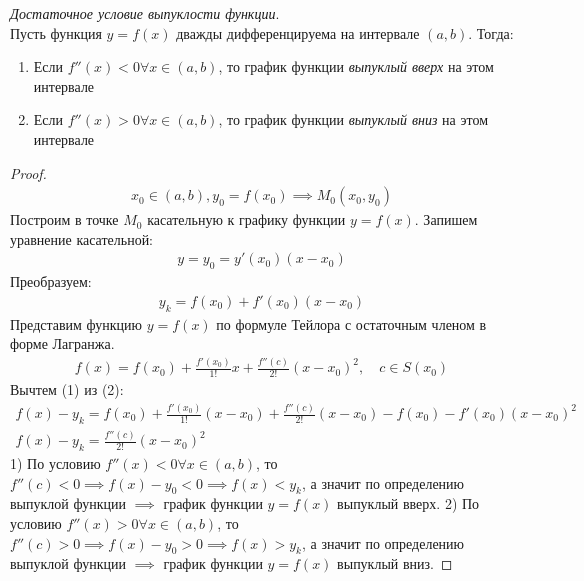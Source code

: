 \begin{theorem}
  \textit{Достаточное условие выпуклости функции}. \\
  Пусть функция $y = f(x)$ дважды дифференцируема на интервале  $(a, b)$. 
  Тогда: 
  \begin{enumerate}
    \item Если  $f''(x) < 0 \forall  x \in (a, b)$, то график функции \textit{выпуклый вверх} на этом интервале
    \item Если  $f''(x) > 0 \forall  x \in (a, b)$, то график функции \textit{выпуклый вниз} на этом интервале
  \end{enumerate}
\end{theorem}
\begin{proof}
  \begin{gather*}
    x_0 \in (a, b), y_0 = f(x_0) \implies M_0(x_0, y_0)
  \end{gather*}
  Построим в точке $M_0$ касательную к графику функции $y = f(x)$. Запишем уравнение касательной:
   \begin{gather*}
    y = y_0 = y'(x_0)(x - x_0) 
  \end{gather*}
  Преобразуем:
  \begin{gather*}
    y_k = f(x_0) + f'(x_0)(x - x_0) \tag{0} 
  \end{gather*}
  Представим функцию $y=f(x)$ по формуле Тейлора с остаточным членом в форме Лагранжа.
  \begin{gather*}
    f(x) = f(x_0) + \frac{f'(x_0)}{1!}x + \frac{f''(c)}{2!}(x - x_0)^2, \quad c \in S(x_0) \tag{2} 
  \end{gather*}
  Вычтем (1) из (2):
  \begin{gather*}
    f(x) - y_k = f(x_0) + \frac{f'(x_{0})}{1!}(x - x_0) + \frac{f''(c)}{2!}(x - x_0) - f(x_0) - f'(x_0)(x - x_0)^2 \\
    f(x) - y_k = \frac{f''(c)}{2!}(x - x_0)^2
  \end{gather*}
  1) По условию $f''(x) < 0 \forall x \in (a, b)$, то $f''(c) < 0 \implies f(x) - y_0 < 0 \implies f(x) < y_k$, а значит по определению выпуклой функции $\implies$ график функции $y = f(x)$ выпуклый вверх.
  2) По условию $f''(x) > 0 \forall x \in (a, b)$, то $f''(c) > 0 \implies f(x) - y_0 > 0 \implies f(x) > y_k$, а значит по определению выпуклой функции $\implies$ график функции $y = f(x)$ выпуклый вниз.
\end{proof}

